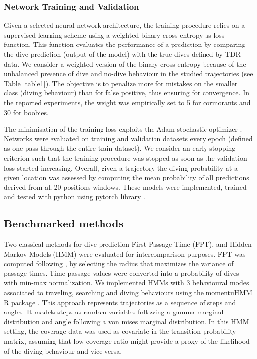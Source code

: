 \documentclass{article}
\begin{document}
\subsubsection{Network Training and Validation}
Given a selected neural network architecture, the training procedure relies on a supervised learning scheme using a weighted binary cross entropy as loss function. 
This function evaluates the performance of a prediction by comparing the dive prediction (output of the model) with the true dives defined by TDR data. We consider a weighted version of the binary cross entropy because of the unbalanced presence of dive and no-dive behaviour in the studied trajectories (see Table \ref{table1}). The objective is to penalize more for mistakes on the smaller class (diving behaviour) than for false positive, thus ensuring for convergence. In the reported experiments, the weight was empirically set to 5 for cormorants and 30 for boobies.

The minimisation of the training loss exploits the  Adam stochastic optimizer \citep{kingma_adam_2015}. Networks were evaluated on training and validation datasets every epoch (defined as one pass through the entire train dataset). We consider an early-stopping criterion such that the training procedure was stopped as soon as the validation loss started increasing. Overall, given a trajectory the diving probability at a given location was assessed by computing the mean probability of all predictions derived from all 20 positions windows. These models were implemented, trained and tested with python using pytorch library \citep{paskze_pytorch_2019}.

\subsection{Benchmarked methods}
Two classical methods for dive prediction First-Passage Time (FPT), and Hidden Markov Models (HMM) were evaluated for intercomparison purposes. FPT was computed following \citep{fauchald_using_2003}, by selecting the radius that maximizes the variance of passage times. Time passage values were converted into a probability of dives with min-max normalization. We implemented HMMs with 3 behavioural modes associated to traveling, searching and diving behaviours using the momentuHMM R package \citep{mcclintock_momentuhmm_2018}. This approach represents trajectories as a sequence of steps and angles. It models steps as random variables following a gamma marginal distribution and angle following a von mises marginal distribution. In this HMM setting, the coverage data was used as covariate in the transition probability matrix, assuming that low coverage ratio might provide a proxy of the likelihood of the diving behaviour and vice-versa.
\end{document}
